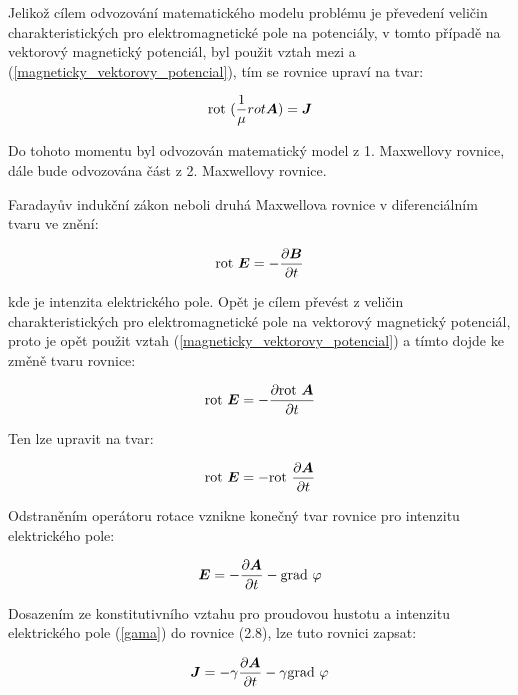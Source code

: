 Jelikož cílem odvozování matematického modelu problému je převedení veličin charakteristických pro elektromagnetické pole na potenciály, v tomto případě na vektorový magnetický potenciál, byl použit vztah mezi  a (\ref{magneticky_vektorovy_potencial}), tím se rovnice upraví na tvar:

\begin{equation}
 \mathrm{rot}\  (\frac{1}{\mu} {rot \mbox{\boldmath$A$}}) = \mbox{\boldmath$J$}
\end{equation}

Do tohoto momentu byl odvozován matematický model z 1. Maxwellovy rovnice, dále bude odvozována část z 2. Maxwellovy rovnice.
	
	Faradayův indukční zákon neboli druhá Maxwellova rovnice v diferenciálním tvaru ve znění:

\begin{equation}
	\mathrm{rot}\  \mbox{\boldmath$E$} = - \frac{\partial \mbox{\boldmath$B$}}{\partial t}
\end{equation}

kde  je intenzita elektrického pole. Opět je cílem převést z veličin charakteristických pro elektromagnetické pole na vektorový magnetický potenciál, proto je opět použit vztah (\ref{magneticky_vektorovy_potencial}) a tímto dojde ke změně tvaru rovnice:

\begin{equation}
	\mathrm{rot}\  \mbox{\boldmath$E$} = - \frac{\partial\mathrm{rot}\ \mbox{\boldmath$A$}}{\partial t}
\end{equation}

Ten lze upravit na tvar:

\begin{equation}
	\mathrm{rot}\  \mbox{\boldmath$E$} = - \mathrm{rot}\  \frac{\partial\mbox{\boldmath$A$}}{\partial t}
\end{equation}

Odstraněním operátoru rotace vznikne konečný tvar rovnice pro intenzitu elektrického pole:

\begin{equation}
	\mbox{\boldmath$E$} = - \frac{\partial \mbox{\boldmath$A$}}{\partial t} - \mathrm{grad}\ {\varphi}
\end{equation}

Dosazením ze konstitutivního vztahu pro proudovou hustotu  a intenzitu elektrického pole  (\ref{gama}) do rovnice (2.8), lze tuto rovnici zapsat:

\begin{equation}
	\mbox{\boldmath$J$} = - \gamma \frac{\partial \mbox{\boldmath$A$}}{\partial t} - \gamma \mathrm{grad}\ {\varphi}
\end{equation}

